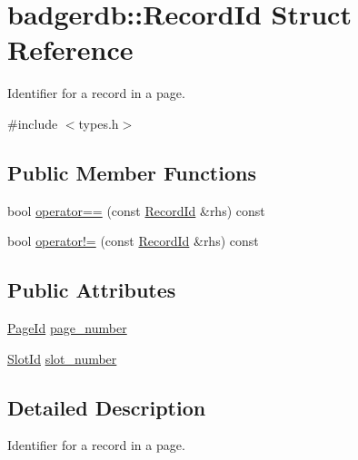 \hypertarget{structbadgerdb_1_1RecordId}{\section{badgerdb\-:\-:Record\-Id Struct Reference}
\label{structbadgerdb_1_1RecordId}
}


Identifier for a record in a page.  




{\ttfamily \#include $<$types.\-h$>$}

\subsection*{Public Member Functions}
\begin{DoxyCompactItemize}
\item 
bool \hyperlink{structbadgerdb_1_1RecordId_a156dc24ebdd2ed2f8ce49b60326646c7}{operator==} (const \hyperlink{structbadgerdb_1_1RecordId}{Record\-Id} \&rhs) const 
\item 
bool \hyperlink{structbadgerdb_1_1RecordId_a0639e3a101d04340853a2b8eedccdf98}{operator!=} (const \hyperlink{structbadgerdb_1_1RecordId}{Record\-Id} \&rhs) const 
\end{DoxyCompactItemize}
\subsection*{Public Attributes}
\begin{DoxyCompactItemize}
\item 
\hyperlink{namespacebadgerdb_a1f49e404293bf4240756b89b53b1587a}{Page\-Id} \hyperlink{structbadgerdb_1_1RecordId_aca5e770e2726e51efed3a47c6457cd94}{page\-\_\-number}
\item 
\hyperlink{namespacebadgerdb_afe9f2f985e7c67e04f76a16f7c4500c8}{Slot\-Id} \hyperlink{structbadgerdb_1_1RecordId_a19ec7b749099499446fdd24d48cec9ef}{slot\-\_\-number}
\end{DoxyCompactItemize}


\subsection{Detailed Description}
Identifier for a record in a page. 


